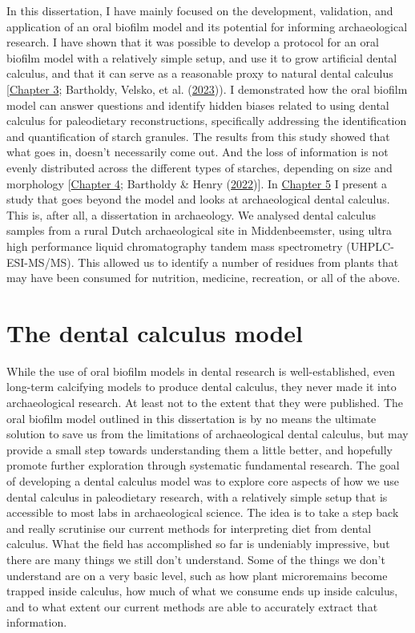 \documentclass[
  letterpaper,
]{book}
\begin{document}
In this dissertation, I have mainly focused on the development,
validation, and application of an oral biofilm model and its potential
for informing archaeological research. I have shown that it was possible
to develop a protocol for an oral biofilm model with a relatively simple
setup, and use it to grow artificial dental calculus, and that it can
serve as a reasonable proxy to natural dental calculus
{[}\protect\hyperlink{byoc-valid}{Chapter 3}; Bartholdy, Velsko, et al.
(\protect\hyperlink{ref-bartholdyAssessingValidity2023}{2023})). I
demonstrated how the oral biofilm model can answer questions and
identify hidden biases related to using dental calculus for paleodietary
reconstructions, specifically addressing the identification and
quantification of starch granules. The results from this study showed
that what goes in, doesn't necessarily come out. And the loss of
information is not evenly distributed across the different types of
starches, depending on size and morphology
{[}\protect\hyperlink{byoc-starch}{Chapter 4}; Bartholdy \& Henry
(\protect\hyperlink{ref-bartholdyInvestigatingBiases2022}{2022}){]}. In
\protect\hyperlink{mb11CalculusPilot}{Chapter 5} I present a study that
goes beyond the model and looks at archaeological dental calculus. This
is, after all, a dissertation in archaeology. We analysed dental
calculus samples from a rural Dutch archaeological site in
Middenbeemster, using ultra high performance liquid chromatography
tandem mass spectrometry (UHPLC-ESI-MS/MS). This allowed us to identify
a number of residues from plants that may have been consumed for
nutrition, medicine, recreation, or all of the above.

\hypertarget{the-dental-calculus-model}{%
\section{The dental calculus model}\label{the-dental-calculus-model}}

While the use of oral biofilm models in dental research is
well-established, even long-term calcifying models to produce dental
calculus, they never made it into archaeological research. At least not
to the extent that they were published. The oral biofilm model outlined
in this dissertation is by no means the ultimate solution to save us
from the limitations of archaeological dental calculus, but may provide
a small step towards understanding them a little better, and hopefully
promote further exploration through systematic fundamental research. The
goal of developing a dental calculus model was to explore core aspects
of how we use dental calculus in paleodietary research, with a
relatively simple setup that is accessible to most labs in
archaeological science. The idea is to take a step back and really
scrutinise our current methods for interpreting diet from dental
calculus. What the field has accomplished so far is undeniably
impressive, but there are many things we still don't understand. Some of
the things we don't understand are on a very basic level, such as how
plant microremains become trapped inside calculus, how much of what we
consume ends up inside calculus, and to what extent our current methods
are able to accurately extract that information.
\end{document}
